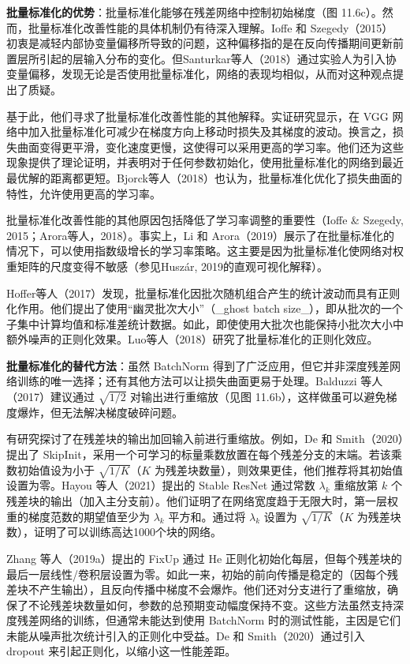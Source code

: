 \textbf{批量标准化的优势}：批量标准化能够在残差网络中控制初始梯度（图 11.6c）。然而，批量标准化改善性能的具体机制仍有待深入理解。Ioffe 和 Szegedy（2015）初衷是减轻内部协变量偏移所导致的问题，这种偏移指的是在反向传播期间更新前置层所引起的层输入分布的变化。但Santurkar等人（2018）通过实验人为引入协变量偏移，发现无论是否使用批量标准化，网络的表现均相似，从而对这种观点提出了质疑。

基于此，他们寻求了批量标准化改善性能的其他解释。实证研究显示，在 VGG 网络中加入批量标准化可减少在梯度方向上移动时损失及其梯度的波动。换言之，损失曲面变得更平滑，变化速度更慢，这使得可以采用更高的学习率。他们还为这些现象提供了理论证明，并表明对于任何参数初始化，使用批量标准化的网络到最近最优解的距离都更短。Bjorck等人（2018）也认为，批量标准化优化了损失曲面的特性，允许使用更高的学习率。

批量标准化改善性能的其他原因包括降低了学习率调整的重要性（Ioffe & Szegedy, 2015；Arora等人，2018）。事实上，Li 和 Arora（2019）展示了在批量标准化的情况下，可以使用指数级增长的学习率策略。这主要是因为批量标准化使网络对权重矩阵的尺度变得不敏感（参见Huszár, 2019的直观可视化解释）。

Hoffer等人（2017）发现，批量标准化因批次随机组合产生的统计波动而具有正则化作用。他们提出了使用“幽灵批次大小”（_ghost batch size_），即从批次的一个子集中计算均值和标准差统计数据。如此，即使使用大批次也能保持小批次大小中额外噪声的正则化效果。Luo等人（2018）研究了批量标准化的正则化效应。

\textbf{批量标准化的替代方法}：虽然 BatchNorm 得到了广泛应用，但它并非深度残差网络训练的唯一选择；还有其他方法可以让损失曲面更易于处理。Balduzzi 等人（2017）建议通过 \(\sqrt{1/2}\) 对输出进行重缩放（见图 11.6b），这样做虽可以避免梯度爆炸，但无法解决梯度破碎问题。

有研究探讨了在残差块的输出加回输入前进行重缩放。例如，De 和 Smith（2020）提出了 SkipInit，采用一个可学习的标量乘数放置在每个残差分支的末端。若该乘数初始值设为小于 \(\sqrt{1/K}\)（\(K\) 为残差块数量），则效果更佳，他们推荐将其初始值设置为零。Hayou 等人（2021）提出的 Stable ResNet 通过常数 \(\lambda_k\) 重缩放第 \(k\) 个残差块的输出（加入主分支前）。他们证明了在网络宽度趋于无限大时，第一层权重的梯度范数的期望值至少为 \(\lambda_k\) 平方和。通过将 \(\lambda_k\) 设置为 \(\sqrt{1/K}\)（\(K\) 为残差块数），证明了可以训练高达1000个块的网络。

Zhang 等人（2019a）提出的 FixUp 通过 He 正则化初始化每层，但每个残差块的最后一层线性/卷积层设置为零。如此一来，初始的前向传播是稳定的（因每个残差块不产生输出），且反向传播中梯度不会爆炸。他们还对分支进行了重缩放，确保了不论残差块数量如何，参数的总预期变动幅度保持不变。这些方法虽然支持深度残差网络的训练，但通常未能达到使用 BatchNorm 时的测试性能，主因是它们未能从噪声批次统计引入的正则化中受益。De 和 Smith（2020）通过引入 dropout 来引起正则化，以缩小这一性能差距。

